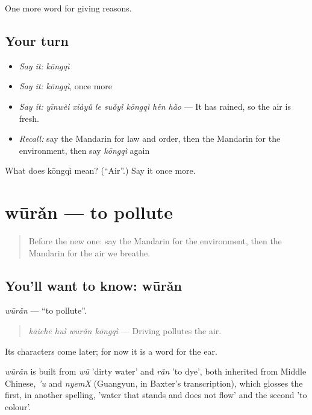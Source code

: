 \begin{grammarlens}[title={What you've built}]
One more word for giving reasons.
\end{grammarlens}

\subsection*{Your turn}
\begin{itemize}
\raggedright
  \item \emph{Say it:} \emph{kōngqì}
  \item \emph{Say it:} \emph{kōngqì}, once more
  \item \emph{Say it:} \emph{yīnwèi xiàyǔ le suǒyǐ kōngqì hěn hǎo} — It has rained, so the air is fresh.
  \item \emph{Recall:} say the Mandarin for law and order, then the Mandarin for the environment, then say \emph{kōngqì} again
\end{itemize}

\begin{tcolorbox}[breakable,colback=teal!4,colframe=teal!35!black,title={Before you move on}]
What does kōngqì mean? (\textquotedblleft{}Air\textquotedblright{}.) Say it once more.
\end{tcolorbox}
\section[wūrǎn]{wūrǎn — to pollute}

\label{lesson:ZH-C380-wuran}



\begin{quote}
Before the new one: say the Mandarin for the environment, then the Mandarin for the air we breathe.
\end{quote}

\subsection*{You'll want to know: wūrǎn}
\emph{wūrǎn} — \textquotedblleft{}to pollute\textquotedblright{}.

\begin{quote}
\emph{kāichē huì wūrǎn kōngqì} — Driving pollutes the air.
\end{quote}

Its characters come later; for now it is a word for the ear.

\begin{cousinweb}
\emph{wūrǎn} is built from \emph{wū} 'dirty water' and \emph{rǎn} 'to dye', both inherited from Middle Chinese, \emph{'u} and \emph{nyemX} (Guangyun, in Baxter's transcription), which glosses the first, in another spelling, 'water that stands and does not flow' and the second 'to colour'.
\end{cousinweb}

